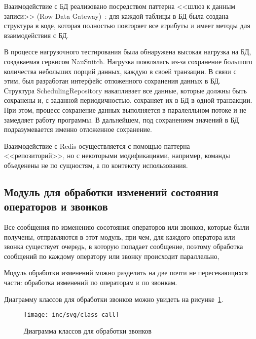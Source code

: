Взаимодействие с БД реализовано посредством паттерна <<шлюз к данным записи>> (Row Data Gateway)~\cite{fauler2019}:
для каждой таблицы в БД %
была создана структура в коде, которая полностью повторяет все атрибуты
и имеет методы для взаимодействия с БД.

В процессе нагрузочного тестирования была обнаружена высокая нагрузка
на БД, создаваемая сервисом NauSnitch.
Нагрузка появлялась из-за сохранение большого количества
небольших порций данных, каждую в своей транзации.
В связи с этим, был разработан интерфейс отложенного сохранения данных в БД.
Структура SchedulingRepository накапливает все данные, которые должны быть сохранены и,
с заданной периодичностью, сохраняет их в БД в одной транзакции.
При этом, процесс сохранение данных выполняется в паралелльном потоке и не замедляет работу программы.
В дальнейшем, под сохранением значений в БД подразумевается именно отложенное сохранение.


Взаимодействие с Redis осуществляется с помощью паттерна <<репозиторий>>, %
но с некоторыми модификациями, например, команды объеденены не по сущностям, а по контексту использования. %

\subsection{Модуль для обработки изменений состояния операторов и звонков}

Все сообщения по изменению сосотояния операторов или звонков, которые были получены,
отправляются в этот модуль, при чем,
для каждого оператора или звонка существует очередь, в которую попадает сообщение,
поэтому обработка сообщений по каждому оператору или звонку происходит параллельно, %

Модуль обработки изменений можно разделить на две почти не пересекающихся части: обработка изменений по операторам и по звонкам.

Диаграмму классов для обработки звонков можно увидеть на рисунке~\ref{pic:call:uml-class}.

\begin{figure}[ht]
    \centering
    \texttt{[image: inc/svg/class\_call]}
    \caption{Диаграмма классов для обработки звонков}
    \label{pic:call:uml-class}
\end{figure}


